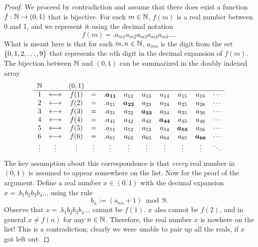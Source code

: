 \documentclass[11pt,twoside=off,numbers=noenddot]{scrbook}
\begin{document}
\begin{proof}
    We proceed by contradiction and assume that there does exist a function $f : \mathbb N \to (0, 1)$ that is bijective. For each $m \in \mathbb N$, $f(m)$ is a real number between 0 and 1, and we represent it using the decimal notation
    \[ f(m) = .a_{m1}a_{m2}a_{m3}a_{m4}a_{m5}\dots. \]
    What is meant here is that for each $m, n \in \mathbb N$, $a_{mn}$ is the digit from the set $\{ 0, 1, 2, \dots, 9 \}$ that represents the $n$th digit in the decimal expansion of $f(m)$. The bijection between $\mathbb N$ and $(0, 1)$ can be summarized in the doubly indexed array
    \begin{align*}
        \begin{array}{ccccccccccc}
            \mathbb N & & (0,1) & & & & & & & & \\
            \hline
            1 & \longleftrightarrow & f(1) & = & .\boldsymbol{a_{11}} & a_{12} & a_{13} & a_{14} & a_{15} & a_{16} & \cdots \\
            2 & \longleftrightarrow & f(2) & = & .a_{21} & \boldsymbol{a_{22}} & a_{23} & a_{24} & a_{25} & a_{26} & \cdots \\
            3 & \longleftrightarrow & f(3) & = & .a_{31} & a_{32} & \boldsymbol{a_{33}} & a_{34} & a_{35} & a_{36} & \cdots \\
            4 & \longleftrightarrow & f(4) & = & .a_{41} & a_{42} & a_{43} & \boldsymbol{a_{44}} & a_{45} & a_{46} & \cdots \\
            5 & \longleftrightarrow & f(5) & = & .a_{51} & a_{52} & a_{53} & a_{54} & \boldsymbol{a_{55}} & a_{56} & \cdots \\
            6 & \longleftrightarrow & f(6) & = & .a_{61} & a_{62} & a_{63} & a_{64} & a_{65} & \boldsymbol{a_{66}} & \cdots \\
            \vdots & \vdots & \vdots & \vdots & \vdots & \vdots & \vdots & \vdots & \vdots & \vdots & \ddots \\
        \end{array}
    \end{align*}
    The key assumption about this correspondence is that \textit{every} real number in $(0, 1)$ is assumed to appear somewhere on the list.
    Now for the pearl of the argument. Define a real number $x \in (0, 1)$ with the decimal expansion $x = .b_1b_2b_3b_4\dots$ using the rule
    \[ b_n := (a_{nn} + 1) \bmod 9. \]
    Observe that $x = .b_1b_2b_3b_4\dots$ cannot be $f(1)$. $x$ also cannot be $f(2)$, and in general $x \neq f(n)$ for any $n \in \mathbb N$. Therefore, the real number $x$ is nowhere on the list! This is a contradiction; clearly we were unable to pair up all the reals, if $x$ got left out.
\end{proof}
\end{document}
